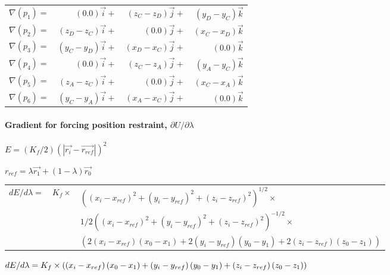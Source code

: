 \begin{tabular}{lrrr}
$\nabla (p_{1})=$ & $(0.0)\overrightarrow{i}+$ & $(z_{C}-z_{D})%
\overrightarrow{j}+$ & $(y_{D}-y_{C})\overrightarrow{k}$ \\ 
$\nabla (p_{2})=$ & $(z_{D}-z_{C})\overrightarrow{i}+$ & $(0.0)%
\overrightarrow{j}+$ & $(x_{C}-x_{D})\overrightarrow{k}$ \\ 
$\nabla (p_{3})=$ & $(y_{C}-y_{D})\overrightarrow{i}+$ & $(x_{D}-x_{C})%
\overrightarrow{j}+$ & $(0.0)\overrightarrow{k}$ \\ 
$\nabla (p_{4})=$ & $(0.0)\overrightarrow{i}+$ & $(z_{C}-z_{A})%
\overrightarrow{j}+$ & $(y_{A}-y_{C})\overrightarrow{k}$ \\ 
$\nabla (p_{5})=$ & $(z_{A}-z_{C})\overrightarrow{i}+$ & $(0.0)%
\overrightarrow{j}+$ & $(x_{C}-x_{A})\overrightarrow{k}$ \\ 
$\nabla (p_{6})=$ & $(y_{C}-y_{A})\overrightarrow{i}+$ & $(x_{A}-x_{C})%
\overrightarrow{j}+$ & $(0.0)\overrightarrow{k}$%
\end{tabular}
\pagebreak 

\paragraph*{Gradient for forcing position restraint, $\partial U/\partial \lambda $}

$E=(K_{f}/2)\left( \left| \overrightarrow{r_{i}}-\overrightarrow{r_{ref}}%
\right| \right) ^{2}$

$r_{ref}=\lambda \overrightarrow{r_{1}}+\left( 1-\lambda \right) 
\overrightarrow{r_{0}}$

\begin{tabular}{lll}
$dE/d\lambda =$ & $K_{f}\times $ & $\left( \left( x_{i}-x_{ref}\right)
^{2}+\left( y_{i}-y_{ref}\right) ^{2}+\left( z_{i}-z_{ref}\right)
^{2}\right) ^{1/2}\times $ \\ 
&  & $1/2\left( \left( x_{i}-x_{ref}\right) ^{2}+\left( y_{i}-y_{ref}\right)
^{2}+\left( z_{i}-z_{ref}\right) ^{2}\right) ^{-1/2}\times $ \\ 
&  & $\left( 2\left( x_{i}-x_{ref}\right) \left( x_{0}-x_{1}\right) +2\left(
y_{i}-y_{ref}\right) \left( y_{0}-y_{1}\right) +2\left( z_{i}-z_{ref}\right)
\left( z_{0}-z_{1}\right) \right) $%
\end{tabular}

$dE/d\lambda =K_{f}\times \left( \left( x_{i}-x_{ref}\right) \left(
x_{0}-x_{1}\right) +\left( y_{i}-y_{ref}\right) \left( y_{0}-y_{1}\right)
+\left( z_{i}-z_{ref}\right) \left( z_{0}-z_{1}\right) \right) \bigskip $

